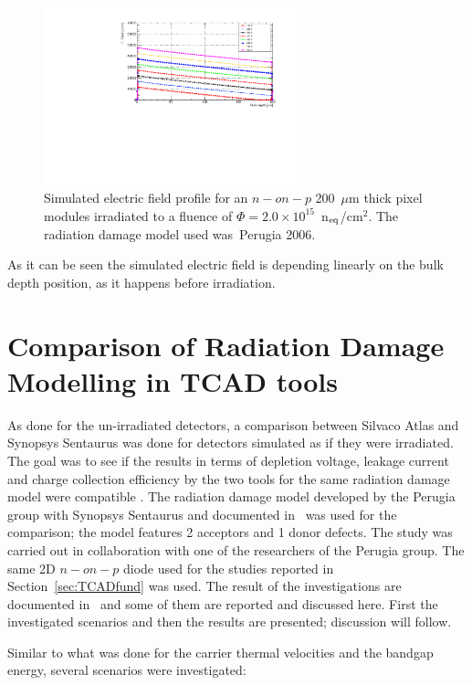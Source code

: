 \begin{figure}[!htpb]
\centering
\includegraphics[width=0.65\textwidth]{EField_Natascha_fl2e15_Petasecca.pdf}
\caption{\label{fig:EField_Profile_Perugia2006}Simulated electric field profile for an $n-on-p$ 200~$\mu$m thick pixel modules irradiated to a fluence of 
$\Phi = 2.0\times10^{15}$~n$_{\rm eq}$/cm$^2$. The radiation damage model used was~Perugia 2006\cite{Moscatelli-2006}.}
\end{figure}
As it can be seen the simulated electric field is depending linearly on the bulk depth position, 
as it happens before irradiation. 

\section{Comparison of Radiation Damage Modelling in TCAD tools}
\label{sec:TCADComparison}
As done for the un-irradiated detectors, a comparison between Silvaco Atlas and Synopsys Sentaurus 
was done for detectors simulated as if they were irradiated. The goal was to see if the results in terms of 
depletion voltage, leakage current and charge collection efficiency  by the two tools for 
the same radiation damage model were 
compatible . 
The radiation damage model developed by the Perugia group with 
Synopsys Sentaurus and documented in~\cite{PASSERI2016443} was 
used for the comparison; the model features 2 acceptors and 1 donor defects. The study was carried out in collaboration with one of  the 
researchers of the Perugia group. 
The same 2D $n-on-p$ diode used for the studies reported in 
Section~\ref{sec:TCADfund} was used.
The result of the investigations are documented in~\cite{bomben_rd50_Torino} and some of them 
are reported and discussed here. First the investigated scenarios and then the results are presented;  
discussion will follow.

Similar to what was done for the carrier thermal  velocities and the bandgap energy, several 
scenarios were investigated: 

